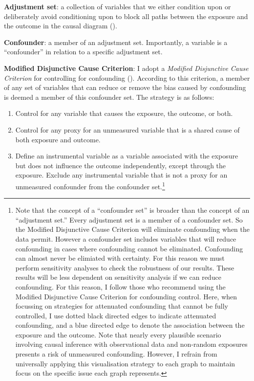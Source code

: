 \documentclass[
  singlecolumn,
  9pt]{article}
\providecommand{\tightlist}{%
  \setlength{\itemsep}{0pt}\setlength{\parskip}{0pt}}\usepackage{longtable,booktabs,array}
\begin{document}
\textbf{Adjustment set}: a collection of variables that we either
condition upon or deliberately avoid conditioning upon to block all
paths between the exposure and the outcome in the causal diagram
().

\textbf{Confounder}: a member of an adjustment set. Importantly, a
variable is a ``confounder'' in relation to a specific adjustment set.

\textbf{Modified Disjunctive Cause Criterion}: I adopt a \emph{Modified
Disjunctive Cause Criterion} for controlling for confounding
(). According to this
criterion, a member of any set of variables that can reduce or remove
the bias caused by confounding is deemed a member of this confounder
set. The strategy is as follows:

\begin{enumerate}
\def\labelenumi{\alph{enumi}.}
\tightlist
\item
  Control for any variable that causes the exposure, the outcome, or
  both.
\item
  Control for any proxy for an unmeasured variable that is a shared
  cause of both exposure and outcome.
\item
  Define an instrumental variable as a variable associated with the
  exposure but does not influence the outcome independently, except
  through the exposure. Exclude any instrumental variable that is not a
  proxy for an unmeasured confounder from the confounder set.\footnote{Note
    that the concept of a ``confounder set'' is broader than the concept
    of an ``adjustment set.'' Every adjustment set is a member of a
    confounder set. So the Modified Disjunctive Cause Criterion will
    eliminate confounding when the data permit. However a confounder set
    includes variables that will reduce confounding in cases where
    confounding cannot be eliminated. Confounding can almost never be
    elimiated with certainty. For this reason we must perform
    sensitivity analyses to check the robustness of our results. These
    results will be less dependent on sensitivity analysis if we can
    reduce confounding. For this reason, I follow those who recommend
    using the Modified Disjunctive Cause Criterion for confounding
    control. Here, when focussing on strategies for attenuated
    confounding that cannot be fully controlled, I use dotted black
    directed edges to indicate attenuated confounding, and a blue
    directed edge to denote the association between the exposure and the
    outcome. Note that nearly every plausible scenario involving causal
    inference with observational data and non-random exposures presents
    a risk of unmeasured confounding. However, I refrain from
    universally applying this visualisation strategy to each graph to
    maintain focus on the specific issue each graph represents.}
\end{enumerate}
\end{document}
